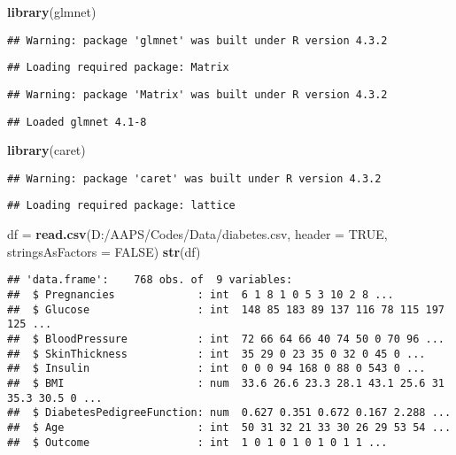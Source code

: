 \documentclass[
]{article}
\newenvironment{Shaded}{\begin{snugshade}}{\end{snugshade}}
\newcommand{\AttributeTok}[1]{\textcolor[rgb]{0.13,0.29,0.53}{#1}}
\newcommand{\ConstantTok}[1]{\textcolor[rgb]{0.56,0.35,0.01}{#1}}
\newcommand{\FunctionTok}[1]{\textcolor[rgb]{0.13,0.29,0.53}{\textbf{#1}}}
\newcommand{\NormalTok}[1]{#1}
\newcommand{\OtherTok}[1]{\textcolor[rgb]{0.56,0.35,0.01}{#1}}
\newcommand{\StringTok}[1]{\textcolor[rgb]{0.31,0.60,0.02}{#1}}
\begin{document}
\begin{Shaded}
\begin{Highlighting}[]
\FunctionTok{library}\NormalTok{(glmnet)}
\end{Highlighting}
\end{Shaded}

\begin{verbatim}
## Warning: package 'glmnet' was built under R version 4.3.2
\end{verbatim}

\begin{verbatim}
## Loading required package: Matrix
\end{verbatim}

\begin{verbatim}
## Warning: package 'Matrix' was built under R version 4.3.2
\end{verbatim}

\begin{verbatim}
## Loaded glmnet 4.1-8
\end{verbatim}

\begin{Shaded}
\begin{Highlighting}[]
\FunctionTok{library}\NormalTok{(caret)}
\end{Highlighting}
\end{Shaded}

\begin{verbatim}
## Warning: package 'caret' was built under R version 4.3.2
\end{verbatim}

\begin{verbatim}
## Loading required package: lattice
\end{verbatim}

\begin{Shaded}
\begin{Highlighting}[]
\NormalTok{df }\OtherTok{=} \FunctionTok{read.csv}\NormalTok{(}\StringTok{\textquotesingle{}D:/AAPS/Codes/Data/diabetes.csv\textquotesingle{}}\NormalTok{, }\AttributeTok{header =} \ConstantTok{TRUE}\NormalTok{, }\AttributeTok{stringsAsFactors =} \ConstantTok{FALSE}\NormalTok{)}
\FunctionTok{str}\NormalTok{(df)}
\end{Highlighting}
\end{Shaded}

\begin{verbatim}
## 'data.frame':    768 obs. of  9 variables:
##  $ Pregnancies             : int  6 1 8 1 0 5 3 10 2 8 ...
##  $ Glucose                 : int  148 85 183 89 137 116 78 115 197 125 ...
##  $ BloodPressure           : int  72 66 64 66 40 74 50 0 70 96 ...
##  $ SkinThickness           : int  35 29 0 23 35 0 32 0 45 0 ...
##  $ Insulin                 : int  0 0 0 94 168 0 88 0 543 0 ...
##  $ BMI                     : num  33.6 26.6 23.3 28.1 43.1 25.6 31 35.3 30.5 0 ...
##  $ DiabetesPedigreeFunction: num  0.627 0.351 0.672 0.167 2.288 ...
##  $ Age                     : int  50 31 32 21 33 30 26 29 53 54 ...
##  $ Outcome                 : int  1 0 1 0 1 0 1 0 1 1 ...
\end{verbatim}
\end{document}
